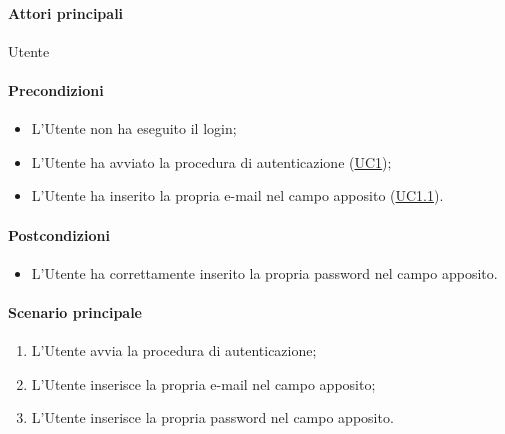 \paragraph*{Attori principali}
Utente

\paragraph*{Precondizioni}
\begin{itemize}
  \item L’Utente non ha eseguito il login;
  \item L’Utente ha avviato la procedura di autenticazione (\hyperref[UC1]{UC1});
  \item L’Utente ha inserito la propria e-mail nel campo apposito (\hyperref[UC1point1]{UC1.1}).
\end{itemize}

\paragraph*{Postcondizioni}
\begin{itemize}
  \item L’Utente ha correttamente inserito la propria password nel campo apposito.
\end{itemize}

\paragraph*{Scenario principale}
\begin{enumerate}
  \item L’Utente avvia la procedura di autenticazione;
  \item L’Utente inserisce la propria e-mail nel campo apposito; 
  \item L’Utente inserisce la propria password nel campo apposito.  
\end{enumerate}
